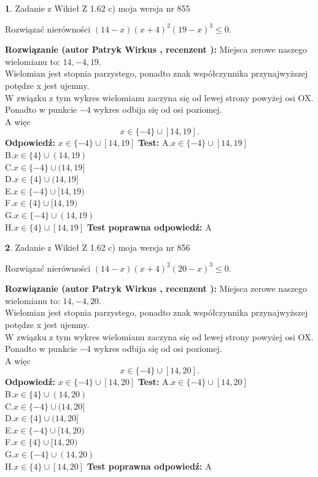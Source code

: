 \documentclass[12pt, a4paper]{article}
\theoremstyle{definition} %
\newtheorem{zad}{}
\newcommand{\zadStart}[1]{\begin{zad}#1\newline}
\newcommand{\zadStop}{\end{zad}}
\newcommand{\rozwStart}[2]{\noindent \textbf{Rozwiązanie (autor #1 , recenzent #2): }\newline}
\newcommand{\rozwStop}{\newline}
\newcommand{\odpStart}{\noindent \textbf{Odpowiedź:}\newline}
\newcommand{\odpStop}{\newline}
\newcommand{\testStart}{\noindent \textbf{Test:}\newline}
\newcommand{\testStop}{\newline}
\newcommand{\kluczStart}{\noindent \textbf{Test poprawna odpowiedź:}\newline}
\newcommand{\kluczStop}{\newline}
\begin{document}
\zadStart{Zadanie z Wikieł Z 1.62 c) moja wersja nr 855}

Rozwiązać nierówności $(14-x)(x+4)^{2}(19-x)^{3}\le0$.
\zadStop
\rozwStart{Patryk Wirkus}{}
Miejsca zerowe naszego wielomianu to: $14, -4, 19$.\\
Wielomian jest stopnia parzystego, ponadto znak współczynnika przy\linebreak najwyższej potędze x jest ujemny.\\ W związku z tym wykres wielomianu zaczyna się od lewej strony powyżej osi OX.\\
Ponadto w punkcie $-4$ wykres odbija się od osi poziomej.\\
A więc $$x \in \{-4\} \cup [14,19].$$
\rozwStop
\odpStart
$x \in \{-4\} \cup [14,19]$
\odpStop
\testStart
A.$x \in \{-4\} \cup [14,19]$\\
B.$x \in \{4\} \cup (14,19)$\\
C.$x \in \{-4\} \cup (14,19]$\\
D.$x \in \{4\} \cup (14,19]$\\
E.$x \in \{-4\} \cup [14,19)$\\
F.$x \in \{4\} \cup [14,19)$\\
G.$x \in \{-4\} \cup (14,19)$\\
H.$x \in \{4\} \cup [14,19]$
\testStop
\kluczStart
A
\kluczStop



\zadStart{Zadanie z Wikieł Z 1.62 c) moja wersja nr 856}

Rozwiązać nierówności $(14-x)(x+4)^{2}(20-x)^{3}\le0$.
\zadStop
\rozwStart{Patryk Wirkus}{}
Miejsca zerowe naszego wielomianu to: $14, -4, 20$.\\
Wielomian jest stopnia parzystego, ponadto znak współczynnika przy\linebreak najwyższej potędze x jest ujemny.\\ W związku z tym wykres wielomianu zaczyna się od lewej strony powyżej osi OX.\\
Ponadto w punkcie $-4$ wykres odbija się od osi poziomej.\\
A więc $$x \in \{-4\} \cup [14,20].$$
\rozwStop
\odpStart
$x \in \{-4\} \cup [14,20]$
\odpStop
\testStart
A.$x \in \{-4\} \cup [14,20]$\\
B.$x \in \{4\} \cup (14,20)$\\
C.$x \in \{-4\} \cup (14,20]$\\
D.$x \in \{4\} \cup (14,20]$\\
E.$x \in \{-4\} \cup [14,20)$\\
F.$x \in \{4\} \cup [14,20)$\\
G.$x \in \{-4\} \cup (14,20)$\\
H.$x \in \{4\} \cup [14,20]$
\testStop
\kluczStart
A
\kluczStop
\end{document}
